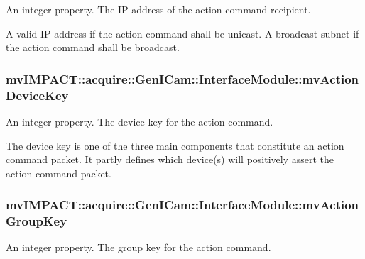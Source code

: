 An integer property. The I\+P address of the action command recipient. 

A valid I\+P address if the action command shall be unicast. A broadcast subnet if the action command shall be broadcast. \hypertarget{classmv_i_m_p_a_c_t_1_1acquire_1_1_gen_i_cam_1_1_interface_module_a55cb974e8f118c77d0b78ec0f9e55f7f}{
\subsubsection[{mv\+Action\+Device\+Key}]{ mv\+I\+M\+P\+A\+C\+T\+::acquire\+::\+Gen\+I\+Cam\+::\+Interface\+Module\+::mv\+Action\+Device\+Key}}\label{classmv_i_m_p_a_c_t_1_1acquire_1_1_gen_i_cam_1_1_interface_module_a55cb974e8f118c77d0b78ec0f9e55f7f}


An integer property. The device key for the action command. 

The device key is one of the three main components that constitute an action command packet. It partly defines which device(s) will positively assert the action command packet. \hypertarget{classmv_i_m_p_a_c_t_1_1acquire_1_1_gen_i_cam_1_1_interface_module_aa76eeb62205a5a0374c6f472daea7999}{
\subsubsection[{mv\+Action\+Group\+Key}]{ mv\+I\+M\+P\+A\+C\+T\+::acquire\+::\+Gen\+I\+Cam\+::\+Interface\+Module\+::mv\+Action\+Group\+Key}}\label{classmv_i_m_p_a_c_t_1_1acquire_1_1_gen_i_cam_1_1_interface_module_aa76eeb62205a5a0374c6f472daea7999}


An integer property. The group key for the action command. 

